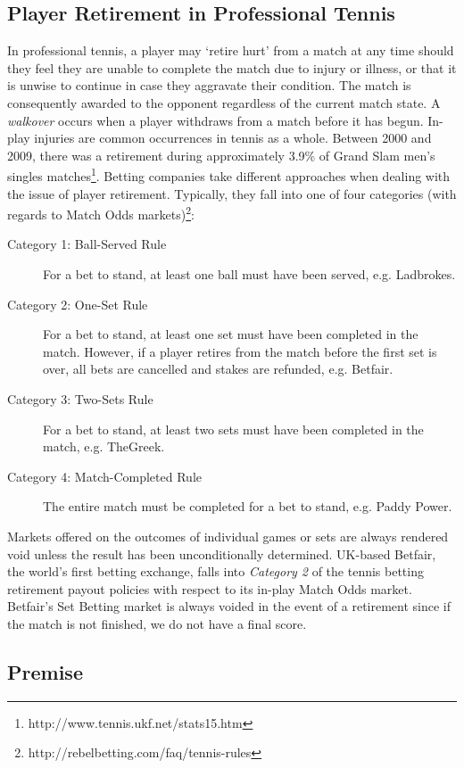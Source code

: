 \documentclass[letterpaper,12pt]{article}
\begin{document}
\subsection{Player Retirement in Professional Tennis}

In professional tennis, a player may `retire hurt' from a match at any time should they feel they are unable to complete the match due to injury or illness, or that it is unwise to continue in case they aggravate their condition.  The match is consequently awarded to the opponent regardless of the current match state.  A \textit{walkover} occurs when a player withdraws from a match before it has begun.  In-play injuries are common occurrences in tennis as a whole.  Between 2000 and 2009, there was a retirement during approximately 3.9\% of Grand Slam men's singles matches\footnote{http://www.tennis.ukf.net/stats15.htm}.  Betting companies take different approaches when dealing with the issue of player retirement.  Typically, they fall into one of four categories (with regards to Match Odds markets)\footnote{http://rebelbetting.com/faq/tennis-rules}:

\begin{description}
	\item[Category 1: Ball-Served Rule] For a bet to stand, at least one ball must have been served, e.g. Ladbrokes.
	\item[Category 2: One-Set Rule] For a bet to stand, at least one set must have been completed in the match.  However, if a player retires from the match before the first set is over, all bets are cancelled and stakes are refunded, e.g. Betfair.
	\item[Category 3: Two-Sets Rule] For a bet to stand, at least two sets must have been completed in the match, e.g. TheGreek.
	\item[Category 4: Match-Completed Rule] The entire match must be completed for a bet to stand, e.g. Paddy Power.
\end{description}

Markets offered on the outcomes of individual games or sets are always rendered void unless the result has been unconditionally determined.  UK-based Betfair, the world's first betting exchange, falls into \textit{Category 2} of the tennis betting retirement payout policies with respect to its in-play Match Odds market.  Betfair's Set Betting market is always voided in the event of a retirement since if the match is not finished, we do not have a final score.

\subsection{Premise}
\end{document}

